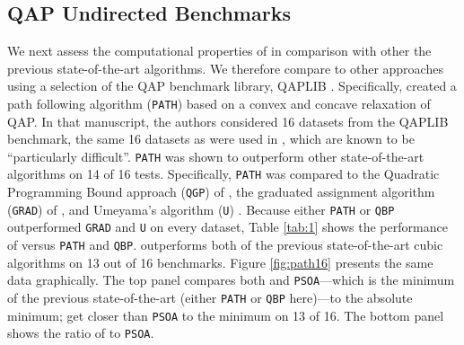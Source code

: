 \documentclass[10pt,journal,cspaper,compsoc]{IEEEtran}
\begin{document}


\subsection{QAP Undirected Benchmarks}
\label{sub:undirected}

We next assess the computational properties of \FAQ in comparison with other the previous state-of-the-art algorithms.  We therefore compare \FAQ to other approaches using a selection of the QAP benchmark library, QAPLIB \cite{Burkard1997}.  Specifically, \cite{Zaslavskiy2009} created a path following algorithm (\texttt{PATH}) based on a convex and concave relaxation of QAP.  In that manuscript, the authors considered 16 datasets from the QAPLIB benchmark, the same 16 datasets as were used in \cite{Schellewald2001}, which are known to be ``particularly difficult''.  \texttt{PATH} was shown to outperform other state-of-the-art algorithms on 14 of 16 tests.  Specifically, \texttt{PATH} was compared to the Quadratic Programming Bound approach (\texttt{QGP}) of \cite{Anstreicher2001}, the graduated assignment algorithm (\texttt{GRAD}) of \cite{Gold1996}, and Umeyama's algorithm (\texttt{U}) \cite{Umeyama1988}.  Because either \texttt{PATH} or \texttt{QBP} outperformed \texttt{GRAD} and \texttt{U} on every dataset, Table \ref{tab:1} shows the performance of \FAQ versus \texttt{PATH} and \texttt{QBP}.  \FAQ outperforms both of the previous state-of-the-art cubic algorithms on 13 out of 16 benchmarks.  Figure \ref{fig:path16} presents the same data graphically. The top panel compares both \FAQ and \texttt{PSOA}---which is the minimum of the previous state-of-the-art (either \texttt{PATH} or \texttt{QBP} here)---to the absolute minimum; \FAQ get closer than \texttt{PSOA} to the minimum on 13 of 16. The bottom panel shows the ratio of \FAQ to \texttt{PSOA}. 
\end{document}
